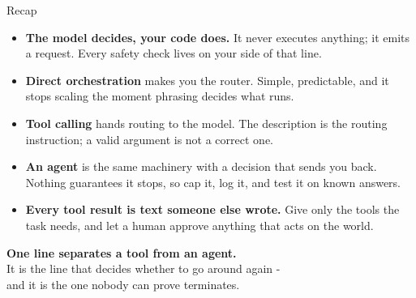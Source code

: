 \documentclass[aspectratio=169]{beamer}
\begin{document}
\begin{frame}{Recap}
  \vspace{0.4em}
  \small
  \begin{itemize}
    \item \textbf{The model decides, your code does.} It never executes anything; it emits a
      request. Every safety check lives on your side of that line.
    \item \textbf{Direct orchestration} makes you the router. Simple, predictable, and it stops
      scaling the moment phrasing decides what runs.
    \item \textbf{Tool calling} hands routing to the model. The description is the routing
      instruction; a valid argument is not a correct one.
    \item \textbf{An agent} is the same machinery with a decision that sends you back. Nothing
      guarantees it stops, so cap it, log it, and test it on known answers.
    \item \textbf{Every tool result is text someone else wrote.} Give only the tools the task
      needs, and let a human approve anything that acts on the world.
  \end{itemize}
\end{frame}

\begin{frame}[plain]
  \vfill
  \begin{center}
    {\Large\bfseries\color{popblue} One line separates a tool from an agent.}\\[0.8em]
    {\large It is the line that decides whether to go around again -}\\[0.25em]
    {\large and it is the one nobody can prove terminates.}
  \end{center}
  \vfill
\end{frame}
\end{document}
